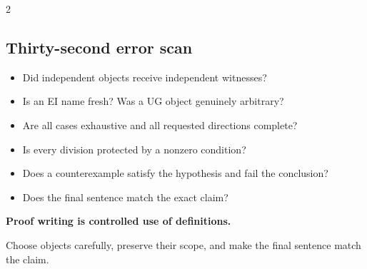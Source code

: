 \documentclass[10pt]{article}
\begin{document}
\begin{multicols}{2}
\subsection*{Thirty-second error scan}
\begin{itemize}
  \item Did independent objects receive independent witnesses?
  \item Is an EI name fresh? Was a UG object genuinely arbitrary?
  \item Are all cases exhaustive and all requested directions complete?
  \item Is every division protected by a nonzero condition?
  \item Does a counterexample satisfy the hypothesis and fail the conclusion?
  \item Does the final sentence match the exact claim?
\end{itemize}
\end{multicols}

\begin{center}
\vfill
{\large\bfseries\color{ProofNavy} Proof writing is controlled use of definitions.}\par
{\small Choose objects carefully, preserve their scope, and make the final
sentence match the claim.}
\end{center}
\end{document}
